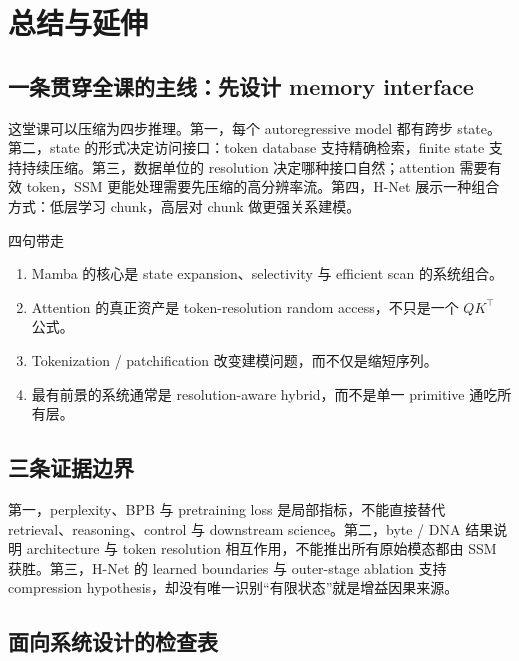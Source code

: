 \section{总结与延伸}

\subsection{一条贯穿全课的主线：先设计 memory interface}

这堂课可以压缩为四步推理。第一，每个 autoregressive model 都有跨步 state。第二，state 的形式决定访问接口：token database 支持精确检索，finite state 支持持续压缩。第三，数据单位的 resolution 决定哪种接口自然；attention 需要有效 token，SSM 更能处理需要先压缩的高分辨率流。第四，H-Net 展示一种组合方式：低层学习 chunk，高层对 chunk 做更强关系建模。

\begin{importantbox}{四句带走}
\begin{enumerate}
  \item Mamba 的核心是 state expansion、selectivity 与 efficient scan 的系统组合。
  \item Attention 的真正资产是 token-resolution random access，不只是一个 $QK^\top$ 公式。
  \item Tokenization / patchification 改变建模问题，而不仅是缩短序列。
  \item 最有前景的系统通常是 resolution-aware hybrid，而不是单一 primitive 通吃所有层。
\end{enumerate}
\end{importantbox}

\subsection{三条证据边界}

第一，perplexity、BPB 与 pretraining loss 是局部指标，不能直接替代 retrieval、reasoning、control 与 downstream science。第二，byte / DNA 结果说明 architecture 与 token resolution 相互作用，不能推出所有原始模态都由 SSM 获胜。第三，H-Net 的 learned boundaries 与 outer-stage ablation 支持 compression hypothesis，却没有唯一识别“有限状态”就是增益因果来源。

\subsection{面向系统设计的检查表}

